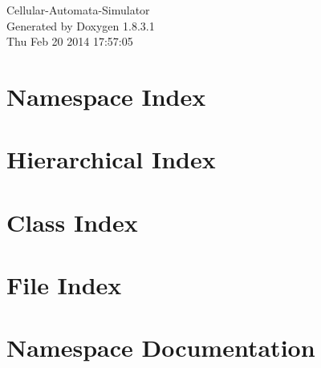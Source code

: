 \documentclass{book}
\begin{document}
\hypersetup{pageanchor=false,citecolor=blue}
\begin{titlepage}
\vspace*{7cm}
\begin{center}
{\Large Cellular-\/\-Automata-\/\-Simulator }\\
\vspace*{1cm}
{\large Generated by Doxygen 1.8.3.1}\\
\vspace*{0.5cm}
{\small Thu Feb 20 2014 17:57:05}\\
\end{center}
\end{titlepage}
\clearemptydoublepage
{}
\tableofcontents
\clearemptydoublepage
{}
\hypersetup{pageanchor=true,citecolor=blue}
\chapter{Namespace Index}

\chapter{Hierarchical Index}

\chapter{Class Index}

\chapter{File Index}

\chapter{Namespace Documentation}







\end{document}
